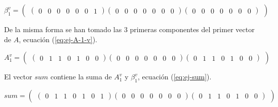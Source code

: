 \begin{equation}\label{eq:ej-beta-1-v}
	{\beta^v_1} = 
		\left(\begin{matrix}
			\left(\begin{smallmatrix}0 & 0 & 0 & 0 & 0 & 0 & 1\end{smallmatrix}\right)			
			\left(\begin{smallmatrix}0 & 0 & 0 & 0 & 0 & 0 & 0\end{smallmatrix}\right)
			\left(\begin{smallmatrix}0 & 0 & 0 & 0 & 0 & 0 & 0\end{smallmatrix}\right)
		\end{matrix}\right)
\end{equation}

De la misma forma se han tomado las $3$ primeras componentes del primer vector de $A$, ecuación (\ref{eq:ej-A-1-v}).

\begin{equation}\label{eq:ej-A-1-v}
	{A^v_1} = 
		\left(\begin{matrix}
			\left(\begin{smallmatrix}0 & 1 & 1 & 0 & 1 & 0 & 0\end{smallmatrix}\right)			
			\left(\begin{smallmatrix}0 & 0 & 0 & 0 & 0 & 0 & 0\end{smallmatrix}\right)
			\left(\begin{smallmatrix}0 & 1 & 1 & 0 & 1 & 0 & 0\end{smallmatrix}\right)
		\end{matrix}\right)
\end{equation}

El vector $sum$ contiene la suma de $A^v_1$ y $\beta^v_1$, ecuación (\ref{eq:ej-sum}).

\begin{equation}\label{eq:ej-sum}
	{sum} = 
		\left(\begin{matrix}
			\left(\begin{smallmatrix}0 & 1 & 1 & 0 & 1 & 0 & 1\end{smallmatrix}\right)			
			\left(\begin{smallmatrix}0 & 0 & 0 & 0 & 0 & 0 & 0\end{smallmatrix}\right)
			\left(\begin{smallmatrix}0 & 1 & 1 & 0 & 1 & 0 & 0\end{smallmatrix}\right)
		\end{matrix}\right)
\end{equation}

